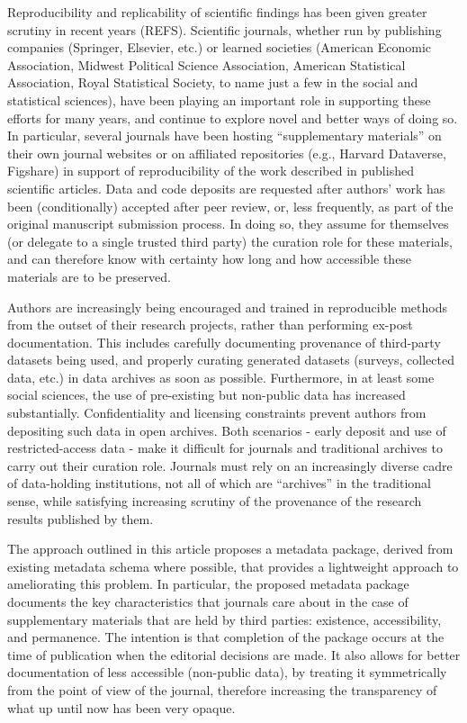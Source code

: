 Reproducibility and replicability of scientific findings has been given greater scrutiny in recent years (REFS). Scientific journals, whether run by publishing companies (Springer, Elsevier, etc.) or learned societies (American Economic Association, Midwest Political Science Association, American Statistical Association, Royal Statistical Society, to name just a few in the social and statistical sciences), have been playing an important role in supporting these efforts for many years, and continue to explore novel and better ways of doing so. In particular, several journals have been hosting ``supplementary materials'' on their own journal websites or on affiliated repositories (e.g., Harvard Dataverse, Figshare) in support of reproducibility of the work described in published scientific articles. Data and code deposits are requested after authors' work has been (conditionally) accepted after peer review, or, less frequently, as part of the original manuscript submission process. In doing so, they assume for themselves (or delegate to a single trusted third party) the curation role for these materials, and can therefore know with certainty how long and how accessible these materials are to be preserved.

Authors are increasingly being encouraged and trained in reproducible methods from the outset of their research projects, rather than performing ex-post documentation. This includes carefully documenting provenance of third-party datasets being used, and properly curating generated datasets (surveys, collected data, etc.) in data archives as soon as possible. Furthermore, in at least some social sciences, the use of pre-existing but non-public data has increased substantially.  Confidentiality and licensing constraints prevent authors from depositing such data in open archives. Both scenarios - early deposit and use of restricted-access data - make it difficult for journals and traditional archives to carry out their curation role. Journals must rely on an increasingly diverse cadre of data-holding institutions, not all of which are ``archives'' in the traditional sense, while satisfying increasing scrutiny of the provenance of the research results published by them. 

The approach outlined in this article proposes a metadata package, derived from existing metadata schema where possible, that provides a lightweight approach to ameliorating this problem. In particular, the proposed metadata package documents the key characteristics that journals care about in the case of supplementary materials that are held by third parties: existence, accessibility, and permanence. The intention is that completion of the package occurs at the time of publication when the editorial decisions are made. It also allows for better documentation of less accessible (non-public data), by treating it symmetrically from the point of view of the journal, therefore increasing the transparency of what up until now has been very opaque.

